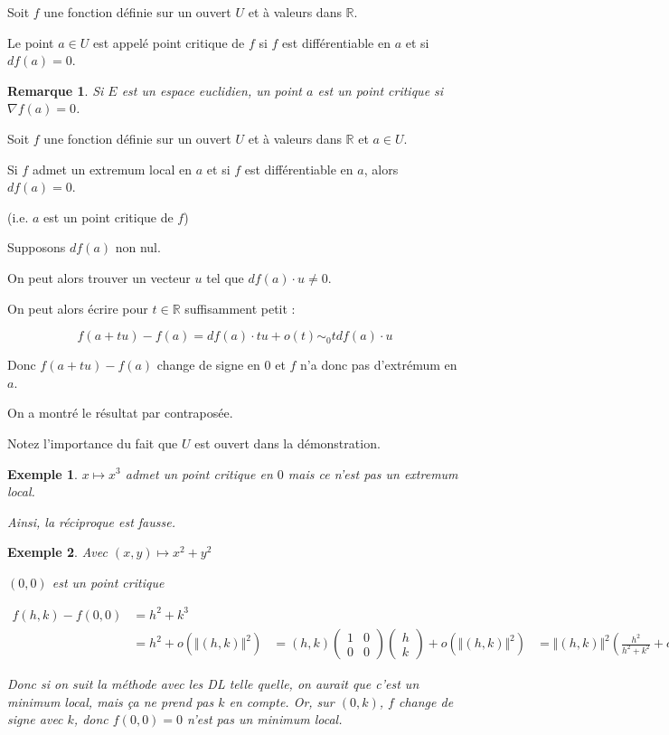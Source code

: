 \documentclass[a4paper,12pt]{book}
\newcommand{\Def}[2]{\begin{tcolorbox}[sharp corners, colback=white,colframe=blue!90!black!75, title=Définition : #1]#2\end{tcolorbox}}
\newcommand{\Thr}[2]{\begin{tcolorbox}[sharp corners, colback=white,colframe=red!90!black!75, title=Théorème : #1]#2\end{tcolorbox}}
\newcommand{\Pre}[1]{\begin{tcolorbox}[sharp corners, colback=white,colframe=green!60!green!30!black!75, title=Preuve]#1\end{tcolorbox}}
\newtheorem{Exe}{Exemple}[section]
\newtheorem{Rem}{Remarque}[section]
\def\R{\mathbb{R}}
\begin{document}
\Def{}{Soit $f$ une fonction définie sur un ouvert $U$ et à valeurs dans $\R$.
\par Le point $a\in U$ est appelé point critique de $f$ si $f$ est différentiable en $a$ et si $df(a)=0$.}
\begin{Rem}
Si $E$ est un espace euclidien, un point $a$ est un point critique si $\nabla f(a)=0$.
\end{Rem}
\Thr{}{Soit $f$ une fonction définie sur un ouvert $U$ et à valeurs dans $\R$ et $a\in U$.
\par Si $f$ admet un extremum local en $a$ et si $f$ est différentiable en $a$, alors $df(a)=0$.
\par (i.e. $a$ est un point critique de $f$)}
\Pre{Supposons $df(a)$ non nul.
\par On peut alors trouver un vecteur $u$ tel que $df(a)\cdot u\neq 0$.
\par On peut alors écrire pour $t\in\R$ suffisamment petit :
\par $$f(a+tu) -f(a) = df(a)\cdot tu+o(t)\sim_0 tdf(a)\cdot u$$
\par Donc $f(a+tu)-f(a)$ change de signe en $0$ et $f$ n'a donc pas d'extrémum en $a$.
\par On a montré le résultat par contraposée.
\par Notez l'importance du fait que $U$ est ouvert dans la démonstration.}
\begin{Exe}
$x\mapsto x^3$ admet un point critique en $0$ mais ce n'est pas un extremum local.
\par Ainsi, la réciproque est fausse.
\end{Exe}
\begin{Exe}
Avec $(x,y)\mapsto x^2+y^2$
\par $(0,0)$ est un point critique
\par \begin{align*} f(h,k)-f(0, 0) &= h^2+k^3\\
&= h^2 + o(\Vert (h,k)\Vert^2)
&= (h,k)\begin{pmatrix} 1 & 0 \\ 0 & 0\end{pmatrix}\begin{pmatrix} h \\ k\end{pmatrix} + o(\Vert (h,k)\Vert^2)
&= \Vert(h,k)\Vert^2\left(\frac{h^2}{h^2+k^2}+o(1)\right)
\end{align*}
\par Donc si on suit la méthode avec les DL  telle quelle, on aurait que c'est un minimum local, mais ça ne prend pas $k$ en compte. Or, sur $(0,k)$, $f$ change de signe avec $k$, donc $f(0,0)=0$ n'est pas un minimum local.
\end{Exe}
\end{document}
